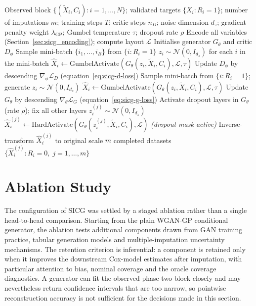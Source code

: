 \begin{algorithm}[t]
\caption{Sample imputation via conditional generative adversarial networks (SICG)}
\label{alg:sicg}
\begin{algorithmic}[1]
\Require Observed block $\{(\tilde{X}_i,C_i) : i = 1, \ldots, N\}$; validated targets $\{X_i : R_i = 1\}$; number of imputations $m$; training steps $T$; critic steps $n_D$; noise dimension $d_z$; gradient penalty weight $\lambda_{\text{GP}}$; Gumbel temperature $\tau$; dropout rate $\rho$
\Statex
\State Encode all variables (Section~\ref{sec:sicg_encoding}); compute layout $\mathcal{L}$
\State Initialise generator $G_\theta$ and critic $D_\phi$
 
        \State Sample mini-batch $\{i_1, \ldots, i_B\}$ from $\{i : R_i = 1\}$
        \State $z_i \sim \mathcal{N}(0, I_{d_z})$ for each $i$ in the mini-batch
        \State $\hat{X}_i \gets \text{GumbelActivate}(G_\theta(z_i, \tilde{X}_i, C_i), \mathcal{L}, \tau)$
        \State Update $D_\phi$ by descending $\nabla_\phi \mathcal{L}_D$ \hfill (equation~\ref{eq:sicg-d-loss})
    \EndFor
    \State Sample mini-batch from $\{i : R_i = 1\}$; generate $z_i \sim \mathcal{N}(0, I_{d_z})$
    \State $\hat{X}_i \gets \text{GumbelActivate}(G_\theta(z_i, \tilde{X}_i, C_i), \mathcal{L}, \tau)$
    \State Update $G_\theta$ by descending $\nabla_\theta \mathcal{L}_G$ \hfill (equation~\ref{eq:sicg-g-loss})
\EndFor
\Statex
{} 
    \State Activate dropout layers in $G_\theta$ (rate $\rho$); fix all other layers
        \State $z_i^{(j)} \sim \mathcal{N}(0, I_{d_z})$
        \State $\hat{X}_i^{(j)} \gets \text{HardActivate}(G_\theta(z_i^{(j)}, \tilde{X}_i, C_i), \mathcal{L})$ \quad \emph{(dropout mask active)}
        \State Inverse-transform $\hat{X}_i^{(j)}$ to original scale
    \EndFor
\EndFor
\Ensure $m$ completed datasets $\{\hat{X}_i^{(j)} : R_i = 0,\; j = 1, \ldots, m\}$
\end{algorithmic}
\end{algorithm}


\section{Ablation Study}
\label{sec:sicg_ablation}

The configuration of SICG was settled by a staged ablation rather than a single head-to-head comparison. Starting from the plain WGAN-GP conditional generator, the ablation tests additional components drawn from GAN training practice, tabular generation models and multiple-imputation uncertainty mechanisms. The retention criterion is inferential: a component is retained only when it improves the downstream Cox-model estimates after imputation, with particular attention to bias, nominal coverage and the oracle coverage diagnostics. A generator can fit the observed phase-two block closely and may nevertheless return confidence intervals that are too narrow, so pointwise reconstruction accuracy is not sufficient for the decisions made in this section.

